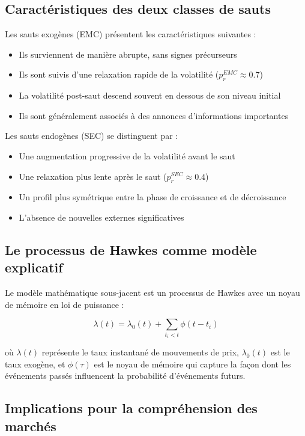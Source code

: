 \documentclass[12pt,a4paper]{article}
\theoremstyle{definition}
\theoremstyle{remark}
\begin{document}
\subsection{Caractéristiques des deux classes de sauts}

Les sauts exogènes (EMC) présentent les caractéristiques suivantes :
\begin{itemize}
    \item Ils surviennent de manière abrupte, sans signes précurseurs
    \item Ils sont suivis d'une relaxation rapide de la volatilité ($p_r^{EMC} \approx 0.7$)
    \item La volatilité post-saut descend souvent en dessous de son niveau initial
    \item Ils sont généralement associés à des annonces d'informations importantes
\end{itemize}

Les sauts endogènes (SEC) se distinguent par :
\begin{itemize}
    \item Une augmentation progressive de la volatilité avant le saut
    \item Une relaxation plus lente après le saut ($p_r^{SEC} \approx 0.4$)
    \item Un profil plus symétrique entre la phase de croissance et de décroissance
    \item L'absence de nouvelles externes significatives
\end{itemize}

\subsection{Le processus de Hawkes comme modèle explicatif}

Le modèle mathématique sous-jacent est un processus de Hawkes avec un noyau de mémoire en loi de puissance :

\begin{equation}
\lambda(t) = \lambda_0(t) + \sum_{t_i < t} \phi(t-t_i)
\end{equation}

où $\lambda(t)$ représente le taux instantané de mouvements de prix, $\lambda_0(t)$ est le taux exogène, et $\phi(\tau)$ est le noyau de mémoire qui capture la façon dont les événements passés influencent la probabilité d'événements futurs.

\subsection{Implications pour la compréhension des marchés}
\end{document}
